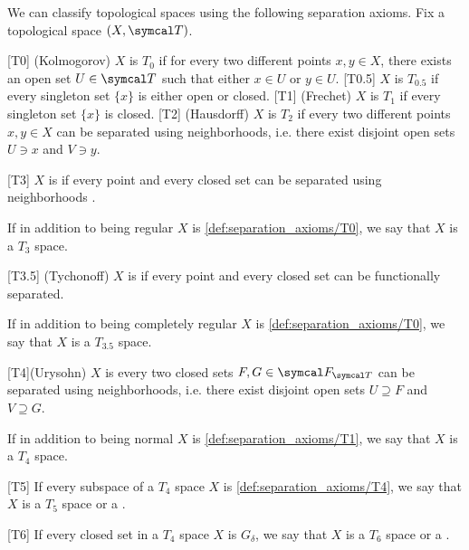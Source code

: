 \begin{definition}\label{def:separation_axioms}
  We can classify topological spaces using the following separation axioms. Fix a topological space \( (X, \Cal{T}) \).

  \begin{description}
    [T0] (Kolmogorov) \( X \) is \( T_0 \) if for every two different points \( x, y \in X \), there exists an open set \( U \in \Cal{T} \) such that either \( x \in U \) or \( y \in U \).
    [T0.5] \( X \) is \( T_{0.5} \) if every singleton set \( \{ x \} \) is either open or closed.
    [T1] (Frechet) \( X \) is \( T_1 \) if every singleton set \( \{ x \} \) is closed.
    [T2] (Hausdorff) \( X \) is \( T_2 \) if every two different points \( x, y \in X \) can be separated using neighborhoods, i.e. there exist disjoint open sets \( U \ni x \) and \( V \ni y \).

    [T3] \( X \) is  if every point and every closed set can be separated using neighborhoods .

    If in addition to being regular \( X \) is \ref{def:separation_axioms/T0}, we say that \( X \) is a \( T_3 \) space.

    [T3.5] (Tychonoff) \( X \) is  if every point and every closed set can be functionally separated.

    If in addition to being completely regular \( X \) is \ref{def:separation_axioms/T0}, we say that \( X \) is a \( T_{3.5} \) space.

    [T4](Urysohn) \( X \) is  every two closed sets \( F, G \in \Cal{F}_{\Cal{T}} \) can be separated using neighborhoods, i.e. there exist disjoint open sets \( U \supseteq F \) and \( V \supseteq G \).

    If in addition to being normal \( X \) is \ref{def:separation_axioms/T1}, we say that \( X \) is a \( T_4 \) space.

    [T5] If every subspace of a \( T_4 \) space \( X \) is \ref{def:separation_axioms/T4}, we say that \( X \) is a \( T_5 \) space or a .

    [T6] If every closed set in a \( T_4 \) space \( X \) is \( G_\delta \), we say that \( X \) is a \( T_6 \) space or a .
  \end{description}
\end{definition}

